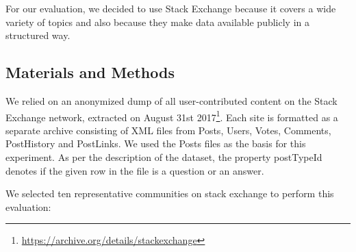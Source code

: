 For our evaluation, we decided to use Stack Exchange because it covers a wide variety of topics and also because they make data available publicly in a structured way. 

\subsection{\hspace*{3pt} Materials and Methods}

We relied on an anonymized dump of all user-contributed content on the Stack Exchange network, extracted on August 31st 2017\footnote{\url{https://archive.org/details/stackexchange}}. Each site is formatted as a separate archive consisting of XML files from Posts, Users, Votes, Comments, PostHistory and PostLinks. We used the Posts files as the basis for this experiment. As per the description of the dataset, the property postTypeId denotes if the given row in the file is a question or an answer. 

We selected ten representative communities on stack exchange to perform this evaluation: 

